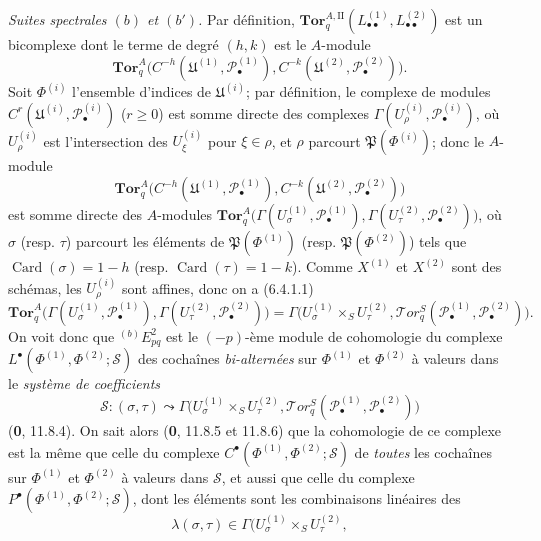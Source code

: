 \begin{env}[6.6.4]
\emph{Suites spectrales $(b)$ et $(b')$.} Par définition,
$\mathbf{Tor}_q^{A,\mathrm{II}}
(L_{\bullet\bullet}^{(1)},L_{\bullet\bullet}^{(2)})$ est un bicomplexe dont
le terme de degré $(h,k)$ est le $A$-module
\[
  \mathbf{Tor}_q^A
  \bigl(C^{-h}(\mathfrak U^{(1)},\mathscr P_\bullet^{(1)}),
        C^{-k}(\mathfrak U^{(2)},\mathscr P_\bullet^{(2)})\bigr).
\]
Soit $\Phi^{(i)}$ l'ensemble d'indices de $\mathfrak U^{(i)}$; par
définition, le complexe de modules
$C^r(\mathfrak U^{(i)},\mathscr P_\bullet^{(i)})$ ($r\geqslant0$) est somme
directe des complexes
$\Gamma(U_\rho^{(i)},\mathscr P_\bullet^{(i)})$, où $U_\rho^{(i)}$ est
l'intersection des $U_\xi^{(i)}$ pour $\xi\in\rho$, et $\rho$ parcourt
$\mathfrak P(\Phi^{(i)})$; donc le $A$-module
\[
  \mathbf{Tor}_q^A
  \bigl(C^{-h}(\mathfrak U^{(1)},\mathscr P_\bullet^{(1)}),
        C^{-k}(\mathfrak U^{(2)},\mathscr P_\bullet^{(2)})\bigr)
\]
est somme directe des $A$-modules
$\mathbf{Tor}_q^A
\bigl(\Gamma(U_\sigma^{(1)},\mathscr P_\bullet^{(1)}),
\Gamma(U_\tau^{(2)},\mathscr P_\bullet^{(2)})\bigr)$,
où $\sigma$ (resp. $\tau$) parcourt les éléments de
$\mathfrak P(\Phi^{(1)})$ (resp. $\mathfrak P(\Phi^{(2)})$) tels que
$\operatorname{Card}(\sigma)=1-h$ (resp.
$\operatorname{Card}(\tau)=1-k$). Comme $X^{(1)}$ et $X^{(2)}$ sont des
schémas, les $U_\rho^{(i)}$ sont affines, donc on a (6.4.1.1)
\[
  \mathbf{Tor}_q^A
  \bigl(\Gamma(U_\sigma^{(1)},\mathscr P_\bullet^{(1)}),
        \Gamma(U_\tau^{(2)},\mathscr P_\bullet^{(2)})\bigr)
  =\Gamma\bigl(U_\sigma^{(1)}\times_S U_\tau^{(2)},
    \mathscr{T}\!or_q^S
    (\mathscr P_\bullet^{(1)},\mathscr P_\bullet^{(2)})\bigr).
\]
On voit donc que ${}^{(b)}E_{pq}^2$ est le $(-p)$-ème module de
cohomologie du complexe
$L^\bullet(\Phi^{(1)},\Phi^{(2)};\mathscr S)$
des cochaînes \emph{bi-alternées} sur $\Phi^{(1)}$ et $\Phi^{(2)}$ à valeurs dans le
\emph{système de coefficients}
\[
  \mathscr S:(\sigma,\tau)\leadsto
  \Gamma\bigl(U_\sigma^{(1)}\times_S U_\tau^{(2)},
    \mathscr{T}\!or_q^S
    (\mathscr P_\bullet^{(1)},\mathscr P_\bullet^{(2)})\bigr)
\]
(\textbf{0}, 11.8.4). On sait alors (\textbf{0}, 11.8.5 et 11.8.6)
que la cohomologie de ce complexe est la même que celle du complexe
$C^\bullet(\Phi^{(1)},\Phi^{(2)};\mathscr S)$ de \emph{toutes} les cochaînes sur
$\Phi^{(1)}$ et $\Phi^{(2)}$ à valeurs dans $\mathscr S$, et aussi que celle du
complexe $P^\bullet(\Phi^{(1)},\Phi^{(2)};\mathscr S)$, dont les éléments sont
les combinaisons linéaires des
\[
  \lambda(\sigma,\tau)\in
  \Gamma\bigl(U_\sigma^{(1)}\times_S U_\tau^{(2)},
\]
\end{env}
